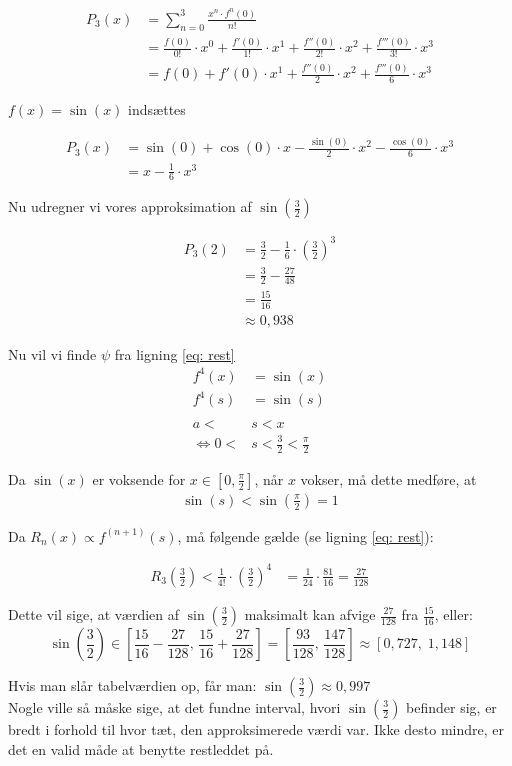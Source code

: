 \begin{align}
	P_3(x)&=\sum^{3}_{n=0}\frac{x^n \cdot f^n(0)}{n!} \\
	&=\frac{f(0)}{0!} \cdot x^0 + \frac{f'(0)}{1!} \cdot x^1 + \frac{f''(0)}{2!} \cdot x^2 + \frac{f'''(0)}{3!} \cdot x^3 \\
	&=f(0) + f'(0) \cdot x^1 + \frac{f''(0)}{2} \cdot x^2 + \frac{f'''(0)}{6} \cdot x^3	
\end{align}

$f(x)=\sin(x)$ indsættes

\begin{align}
	P_3(x)&=\sin(0) + \cos(0) \cdot x - \frac{\sin(0)}{2} \cdot x^2 - \frac{\cos(0)}{6} \cdot x^3 \\
	&=x-\frac{1}{6} \cdot x^3
\end{align}

Nu udregner vi vores approksimation af $\sin(\frac{3}{2})$

\begin{align}
	P_3(2)&=\frac{3}{2}-\frac{1}{6} \cdot \left(\frac{3}{2}\right)^3 \\
	&=\frac{3}{2}-\frac{27}{48} \\
	&=\frac{15}{16}\\
	&\approx 0,938
\end{align}

Nu vil vi finde $\psi$ fra ligning \eqref{eq: rest}
\begin{align*}
	f^4(x)&=\sin(x) \\
	f^4(s)&=\sin(s) \\\\
	a<&s<x \\
	\iff 0<&s<\frac{3}{2}<\frac{\pi}{2}
\end{align*}



Da $\sin(x)$ er voksende for $x \in [0,\frac{\pi}{2}]$, når $x$ vokser, må dette medføre, at
\begin{align*}
	\sin(s) < \sin\left(\frac{\pi}{2}\right)=1
\end{align*}

Da $R_n(x) \propto f^{(n+1)}(s)$, må følgende gælde (se ligning \eqref{eq: rest}):

\begin{align}
	R_3\left(\frac{3}{2}\right)<\frac{1}{4!} \cdot \left(\frac{3}{2}\right)^4&=\frac{1}{24} \cdot \frac{81}{16}=\frac{27}{128}
\end{align}

Dette vil sige, at værdien af $\sin\left(\frac{3}{2}\right)$ maksimalt kan afvige $\frac{27}{128}$ fra $\frac{15}{16}$, eller:
\begin{equation*}
	\sin\left(\frac{3}{2}\right) \in \left[\frac{15}{16}-\frac{27}{128}, \,\frac{15}{16}+\frac{27}{128}\right]=\left[\frac{93}{128}, \, \frac{147}{128}\right] \approx [0,727, \; 1,148]
\end{equation*}

Hvis man slår tabelværdien op, får man: $\sin\left(\frac{3}{2}\right)\approx 0,997$ \\
Nogle ville så måske sige, at det fundne interval, hvori $\sin\left(\frac{3}{2}\right)$ befinder sig, er bredt i forhold til hvor tæt, den approksimerede værdi var. Ikke desto mindre, er det en valid måde at benytte restleddet på.